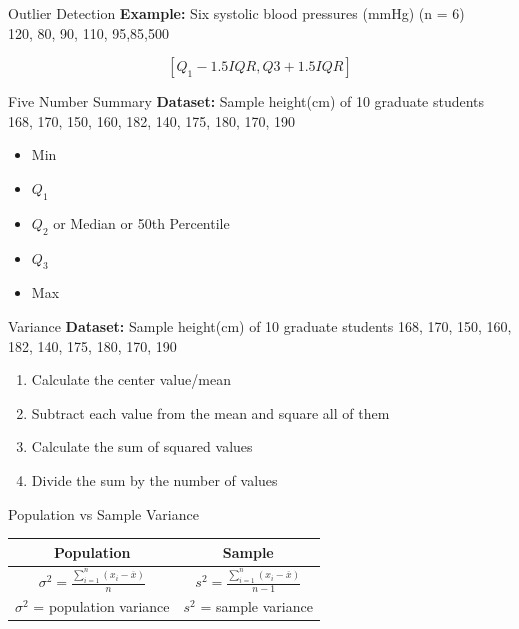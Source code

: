 \documentclass[10pt,dvipsnames, aspectratio=169]{beamer}
\begin{document}
\begin{frame}[t]{Outlier Detection}
	\textbf{Example:}	Six systolic blood pressures (mmHg) (n = 6) \\
	120, 80, 90, 110, 95,85,500
	
	$$
	[Q_1 - 1.5IQR, Q3+1.5IQR]
	$$
	
\end{frame}


\begin{frame}[t]{Five Number Summary}
	\textbf{Dataset:} Sample height(cm) of 10 graduate students 168, 170, 
	150, 160, 182, 140, 175, 180, 170, 190
	
	\begin{itemize}
		\item Min
		\item $Q_1$
		\item $Q_2$ or Median or 50th Percentile
		\item $Q_3$
		\item Max
	\end{itemize}
\end{frame}




\begin{frame}[t]{Variance}
	\textbf{Dataset:} Sample height(cm) of 10 graduate students 168, 170, 
	150, 160, 182, 140, 175, 180, 170, 190
	\begin{enumerate}
		\item Calculate the center value/mean 
		\item Subtract each value from the mean and square all of them
		\item Calculate the sum of squared values 
		\item Divide the sum by the number of values 
	\end{enumerate}
\end{frame}

\begin{frame}[t]{Population vs Sample Variance}
	\begin{center}
		\begin{tabular}{|c|c|} 
			\hline 
			Population & Sample \\ 
			\hline 
			$\sigma^2  = \frac{\sum_{i=1}^{n} (x_i - \overline{x}) }{n}$ & 
			$ s^2  = 
			\frac{\sum_{i=1}^{n} 
				(x_i - \overline{x}) }{n-1}$ \\
			\hline
			$\sigma^2$ =  population variance  & $s^2$ = sample variance\\ 
			\hline 
		\end{tabular}
	\end{center}
\end{frame}
\end{document}
